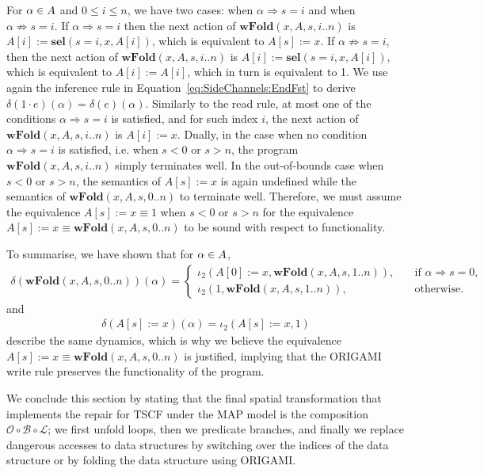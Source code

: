 For $\alpha \in A$ and $0\leq i\leq n$, we have two cases: when $\alpha \Rightarrow s=i$ and when $\alpha \not\Rightarrow s=i$. If $\alpha \Rightarrow s=i$ then the next action of $\textbf{wFold}(x,A,s,i..n)$ is $A[i]:=\textbf{sel}(s=i,x,A[i])$, which is equivalent to $A[s]:=x$. If $\alpha \not \Rightarrow s=i$, then the next action of $\textbf{wFold}(x,A,s,i..n)$ is $A[i]:=\textbf{sel}(s=i,x,A[i])$, which is equivalent to $A[i]:=A[i]$, which in turn is equivalent to 1. We use again the inference rule in Equation~\ref{eq:SideChannels:EndFst} to derive $\delta(1\cdot e)(\alpha)=\delta(e)(\alpha)$. Similarly to the read rule, at most one of the conditions $\alpha \Rightarrow s=i$ is satisfied, and for such index $i$, the next action of $\textbf{wFold}(x,A,s,i..n)$ is $A[i]:=x$. Dually, in the case when no condition $\alpha \Rightarrow s=i$ is satisfied, i.e. when $s<0$ or $s>n$, the program $\textbf{wFold}(x,A,s,i..n)$ simply terminates well. In the out-of-bounds case when $s<0$ or $s>n$, the semantics of $A[s]:=x$ is again undefined while the semantics of $\textbf{wFold}(x,A,s,0..n)$ to terminate well. Therefore, we must assume the equivalence $A[s]:=x\equiv 1$ when $s<0$ or $s>n$ for the equivalence $A[s]:=x\equiv \textbf{wFold}(x,A,s,0..n)$ to be sound with respect to functionality.

To summarise, we have shown that for $\alpha \in A$, 
\begin{align*}
    \delta(\textbf{wFold}(x,A,s,0..n))(\alpha)=
    \begin{cases}
        \iota_2(A[0]:=x,\textbf{wFold}(x,A,s,1..n)),&\quad\text{if $\alpha \Rightarrow s=0$},\\
        \iota_2(1,\textbf{wFold}(x,A,s,1..n)),&\quad\text{otherwise}.
    \end{cases}
\end{align*}
and
\begin{align*}
    \delta(A[s]:=x)(\alpha)= \iota_2(A[s]:=x,1)
\end{align*}
describe the same dynamics, which is why we believe the equivalence $A[s]:=x\equiv \textbf{wFold}(x,A,s,0..n)$ is justified, implying that the ORIGAMI write rule preserves the functionality of the program.

We conclude this section by stating that the final spatial transformation that implements the repair for TSCF under the MAP model is the composition $\mathscr{O}\circ \mathscr{B}\circ \mathscr{L}$; we first unfold loops, then we predicate branches, and finally we replace dangerous accesses to data structures by switching over the indices of the data structure or by folding the data structure using ORIGAMI. 

